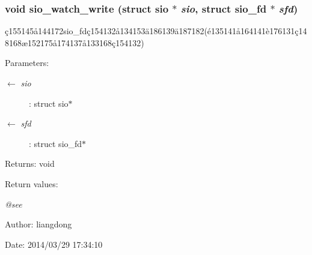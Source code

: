 \subsubsection{\setlength{\rightskip}{0pt plus 5cm}void sio\_\-watch\_\-write (struct sio $\ast$ {\em sio}, struct sio\_\-fd $\ast$ {\em sfd})}\label{sio_8c_a7}


\c{c}155145\aa{}144172sio\_\-fd\c{c}154132\aa{}134153\"{a}186139\"{a}187182(\'{e}135141\aa{}164141\`{e}176131\c{c}148168\ae{}152175\aa{}174137\aa{}133168\c{c}154132) 

\begin{Desc}
\item[Parameters:]
\begin{description}
\item[\mbox{$\leftarrow$} {\em sio}]: struct sio$\ast$ \item[\mbox{$\leftarrow$} {\em sfd}]: struct sio\_\-fd$\ast$ \end{description}
\end{Desc}
\begin{Desc}
\item[Returns:]void \end{Desc}
\begin{Desc}
\item[Return values:]
\begin{description}
\item[{\em @see}]\end{description}
\end{Desc}
\begin{Desc}
\item[Author:]liangdong \end{Desc}
\begin{Desc}
\item[Date:]2014/03/29 17:34:10 \end{Desc}
